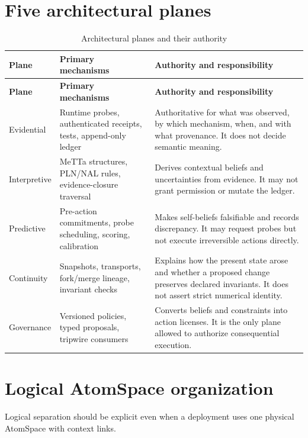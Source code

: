\documentclass[11pt,oneside]{report}
\begin{document}
\section{Five architectural planes}

\begin{longtable}{@{}L{1.15in}L{1.85in}L{3.45in}@{}}
\caption{Architectural planes and their authority}\label{tab:planes}\\
\toprule
\textbf{Plane} & \textbf{Primary mechanisms} & \textbf{Authority and responsibility} \\
\midrule
\endfirsthead
\toprule
\textbf{Plane} & \textbf{Primary mechanisms} & \textbf{Authority and responsibility} \\
\midrule
\endhead
Evidential & Runtime probes, authenticated receipts, tests, append-only ledger & Authoritative for what was observed, by which mechanism, when, and with what provenance. It does not decide semantic meaning. \\
Interpretive & MeTTa structures, PLN/NAL rules, evidence-closure traversal & Derives contextual beliefs and uncertainties from evidence. It may not grant permission or mutate the ledger. \\
Predictive & Pre-action commitments, probe scheduling, scoring, calibration & Makes self-beliefs falsifiable and records discrepancy. It may request probes but not execute irreversible actions directly. \\
Continuity & Snapshots, transports, fork/merge lineage, invariant checks & Explains how the present state arose and whether a proposed change preserves declared invariants. It does not assert strict numerical identity. \\
Governance & Versioned policies, typed proposals, tripwire consumers & Converts beliefs and constraints into action licenses. It is the only plane allowed to authorize consequential execution. \\
\bottomrule
\end{longtable}

\section{Logical AtomSpace organization}

Logical separation should be explicit even when a deployment uses one physical AtomSpace with context links.
\end{document}
